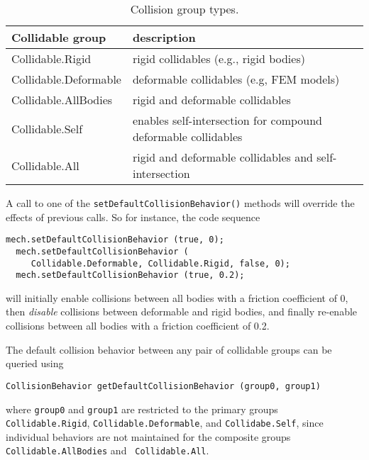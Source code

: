 \begin{table}[h]
\begin{center}
\begin{tabular}{|ll|}
\hline
Collidable group & description \\
\hline
Collidable.Rigid & rigid collidables (e.g., rigid bodies) \\
Collidable.Deformable & deformable collidables (e.g, FEM models) \\
Collidable.AllBodies & rigid and deformable collidables \\
Collidable.Self & enables self-intersection
for compound deformable collidables\\
Collidable.All & rigid and deformable collidables and self-intersection\\
\hline
\end{tabular}
\end{center}
\caption{Collision group types.}
\label{CollisionGroups:tab}
\end{table}

A call to one of the {\tt setDefaultCollisionBehavior()} methods will
override the effects of previous calls. So for instance, the code
sequence
%
\begin{lstlisting}[]
  mech.setDefaultCollisionBehavior (true, 0);
  mech.setDefaultCollisionBehavior (
     Collidable.Deformable, Collidable.Rigid, false, 0);
  mech.setDefaultCollisionBehavior (true, 0.2);
\end{lstlisting}
%
will initially enable collisions between all bodies with a friction
coefficient of 0, then {\it disable} collisions between deformable and
rigid bodies, and finally re-enable collisions between all bodies with
a friction coefficient of 0.2.

The default collision behavior between any pair of collidable groups can
be queried using
%
\begin{lstlisting}[]
  CollisionBehavior getDefaultCollisionBehavior (group0, group1)
\end{lstlisting}
%
where {\tt group0} and {\tt group1} are restricted to the
primary groups {\tt Collidable.Rigid}, {\tt Collidable.Deformable},
and {\tt Collidabe.Self}, since individual behaviors are not
maintained for the composite groups {\tt Collidable.AllBodies} and {\tt
Collidable.All}.

